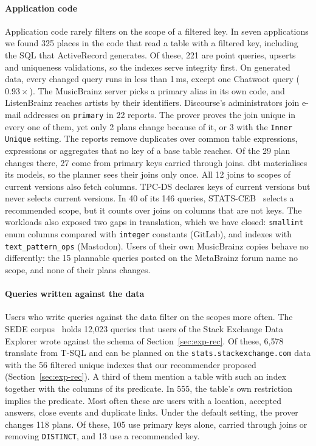 \documentclass[conference]{IEEEtran}
\theoremstyle{definition}
\newcommand{\sql}[1]{\texttt{#1}}
\newif\ifextended
\begin{document}
\paragraph*{Application code} Application code rarely filters on the scope of a filtered key. In
seven applications we found 325 places in the code that read a table with a filtered key, including the SQL that
ActiveRecord generates. Of these, 221 are point queries, upserts and uniqueness validations, so the indexes serve
integrity first. On generated data, every changed query runs in less than 1\,ms, except one Chatwoot query
($0.93\times$). The MusicBrainz server picks a primary alias in its own code, and ListenBrainz reaches artists by their
identifiers. Discourse's administrators join e-mail addresses on \sql{primary} in 22 reports. The prover proves the join
unique in every one of them, yet only 2 plans change because of it, or 3 with the \sql{Inner Unique} setting. The reports
remove duplicates over common table expressions, expressions or aggregates that no key of a base table reaches. Of the
29 plan changes there, 27 come from primary keys carried through joins. dbt materialises its models, so the planner sees
their joins only once. All 12 joins to scopes of current versions also fetch columns. TPC-DS declares keys of current
versions but never selects current versions. In 40 of its 146 queries, STATS-CEB~\cite{STATSCEB} selects a recommended
scope, but it counts over joins on columns that are not keys. The workloads also exposed two gaps in translation, which
we have closed: \sql{smallint} enum columns compared with \sql{integer} constants (GitLab), and indexes with
\sql{text\_pattern\_ops} (Mastodon). Users of their own MusicBrainz copies behave no differently: the 15 plannable queries posted on the
MetaBrainz forum name no scope, and none of their plans changes.

\ifextended
\paragraph*{Queries written against the data} Users who write queries against the data filter on the scopes more
often. The SEDE corpus~\cite{SEDE} holds 12{,}023 queries that users of the Stack Exchange Data Explorer wrote against
the schema of Section~\ref{sec:exp-rec}. Of these, 6{,}578 translate from T-SQL and can be planned on the
\sql{stats.stackexchange.com} data with the 56 filtered unique indexes that our recommender proposed
(Section~\ref{sec:exp-rec}). A third of them mention a table with such an index together with the columns of its
predicate. In 555, the table's own restriction implies the predicate. Most often these are users with a location,
accepted answers, close events and duplicate links. Under the default setting, the prover changes 118 plans. Of these,
105 use primary keys alone, carried through joins or removing \sql{DISTINCT}, and 13 use a recommended key.
\end{document}
